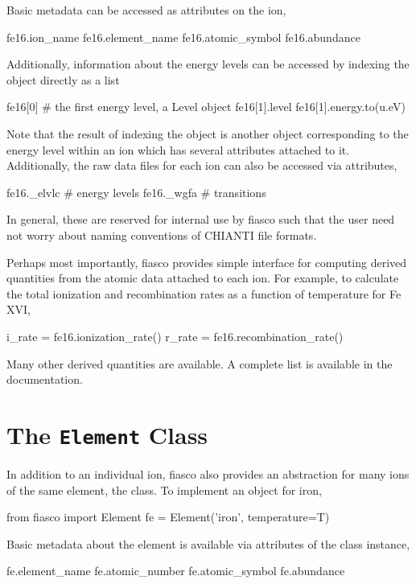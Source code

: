 Basic metadata can be accessed as attributes on the ion,
\begin{pyblock}[appendix1][baselinestretch=1,xleftmargin=3em]
fe16.ion_name
fe16.element_name
fe16.atomic_symbol
fe16.abundance
\end{pyblock}
Additionally, information about the energy levels can be accessed by indexing the object directly as a list
\begin{pyblock}[appendix1][baselinestretch=1,xleftmargin=3em]
fe16[0] # the first energy level, a Level object
fe16[1].level
fe16[1].energy.to(u.eV)
\end{pyblock}
Note that the result of indexing the  object is another object corresponding to the energy level within an ion which has several attributes attached to it. Additionally, the raw data files for each ion can also be accessed via attributes,
\begin{pyblock}[appendix1][baselinestretch=1,xleftmargin=3em]
fe16._elvlc # energy levels
fe16._wgfa # transitions 
\end{pyblock}
In general, these are reserved for internal use by fiasco such that the user need not worry about naming conventions of CHIANTI file formats.

Perhaps most importantly, fiasco provides simple interface for computing derived quantities from the atomic data attached to each ion. For example, to calculate the total ionization and recombination rates as a function of temperature for Fe XVI,
\begin{pyblock}[appendix1][baselinestretch=1,xleftmargin=3em]
i_rate = fe16.ionization_rate()
r_rate = fe16.recombination_rate()
\end{pyblock}
Many other derived quantities are available. A complete list is available in the documentation.

\section{The \texttt{Element} Class}\label{sec:fiasco-element}

In addition to an individual ion, fiasco also provides an abstraction for many ions of the same element, the  class. To implement an  object for iron,
\begin{pyblock}[appendix1][baselinestretch=1,xleftmargin=3em]
from fiasco import Element
fe = Element('iron', temperature=T)
\end{pyblock}
Basic metadata about the element is available via attributes of the class instance,
\begin{pyblock}[appendix1][baselinestretch=1,xleftmargin=3em]
fe.element_name
fe.atomic_number
fe.atomic_symbol
fe.abundance
\end{pyblock}

